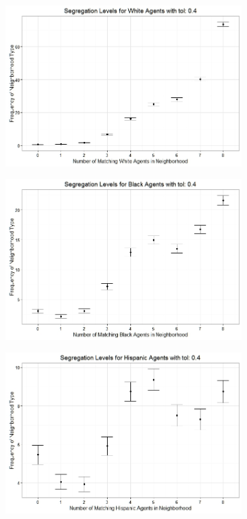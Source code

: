 \begin{figure}[h!]
\centering
\begin{subfigure}{.5\textwidth}
  \centering
\includegraphics[scale=.35]{figures/2010_4_White.jpeg}
\end{subfigure}%
\begin{subfigure}{.5\textwidth}
  \centering
\includegraphics[scale=.35]{figures/2010_4_Black.jpeg}
\end{subfigure}
\hfill \break \hfill \break
\begin{subfigure}{.5\textwidth}
  \centering
\includegraphics[scale=.35]{figures/2010_4_Hispanic.jpeg}

\end{subfigure}
\end{figure}
